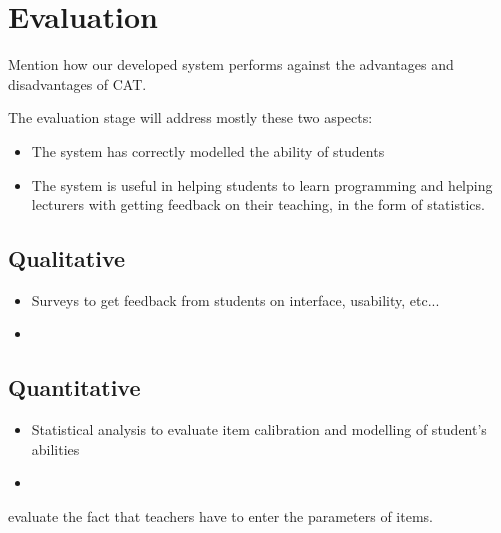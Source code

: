 \chapter{Evaluation}
Mention how our developed system performs against the advantages and disadvantages of CAT.

The evaluation stage will address mostly these two aspects:
\begin{itemize}
\item The system has correctly modelled the ability of students
\item The system is useful in helping students to learn programming and helping lecturers with getting feedback on their teaching, in the form of statistics.
\end{itemize}

\section{Qualitative}
\begin{itemize}
\item Surveys to get feedback from students on interface, usability, etc...
\item 
\end{itemize}

\section{Quantitative}
\begin{itemize}
\item Statistical analysis to evaluate item calibration and modelling of student's abilities
\item 
\end{itemize}

evaluate the fact that teachers have to enter the parameters of items.